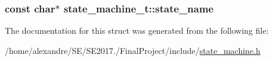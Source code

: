 \subsubsection[{\texorpdfstring{state\+\_\+name}{state_name}}]{\setlength{\rightskip}{0pt plus 5cm}const char$\ast$ state\+\_\+machine\+\_\+t\+::state\+\_\+name}\hypertarget{structstate__machine__t_a80c4c7668792fd3918487aa242693800}{}\label{structstate__machine__t_a80c4c7668792fd3918487aa242693800}


The documentation for this struct was generated from the following file\+:\begin{DoxyCompactItemize}
\item 
/home/alexandre/\+S\+E/\+S\+E2017./\+Final\+Project/include/\hyperlink{state__machine_8h}{state\+\_\+machine.\+h}\end{DoxyCompactItemize}
